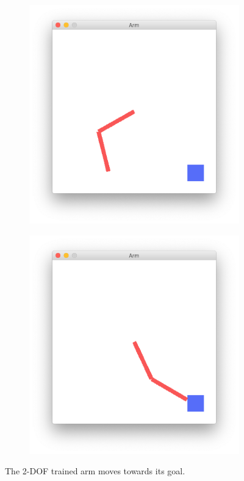 \documentclass{article}
\begin{document}
\begin{figure}[t]
\begin{subfigure}{.225\textwidth}
  \end{subfigure}
  \begin{subfigure}{.225\textwidth}
    \includegraphics[width=\linewidth]{arm2.png}
  \end{subfigure}
  \begin{subfigure}{.225\textwidth}
    \includegraphics[width=\linewidth]{arm3.png}
  \end{subfigure}
\caption{The 2-DOF trained arm moves towards its goal.}
\label{fig:env-example}
\end{figure}
\end{document}
